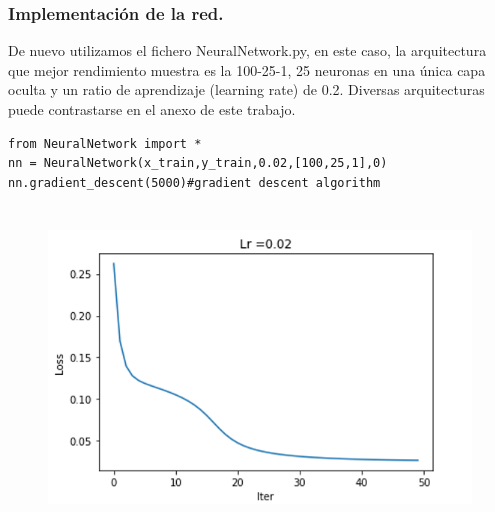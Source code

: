 \documentclass[a4paper,10pt]{article}
\begin{document}
\subsubsection{Implementación de la red.}
De nuevo utilizamos el fichero NeuralNetwork.py, en este caso, la  arquitectura  que mejor rendimiento muestra es la 100-25-1, 25 neuronas en una única capa oculta y un ratio de aprendizaje (learning rate) de 0.2. Diversas arquitecturas puede contrastarse en el anexo de este trabajo.
\begin{lstlisting}
from NeuralNetwork import * 
nn = NeuralNetwork(x_train,y_train,0.02,[100,25,1],0)
nn.gradient_descent(5000)#gradient descent algorithm
\end{lstlisting}
\begin{figure}[H]
	\centering
	\includegraphics[width=12.0cm,height=8.5cm]{Annotation 2020-03-23171823}
\end{figure}
\end{document}
